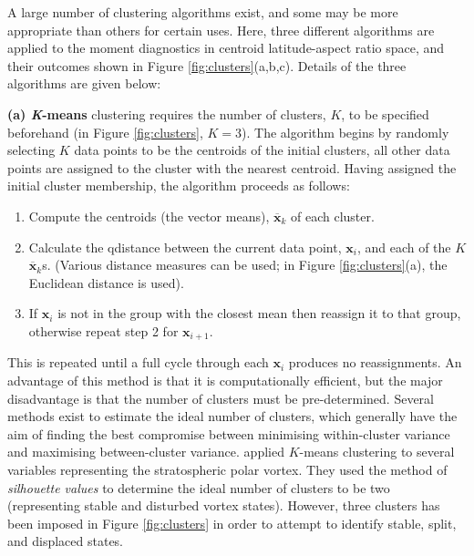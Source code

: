 A large number of clustering algorithms exist, and some may be more appropriate
than others for certain uses. Here, three different algorithms are applied to
the moment diagnostics in centroid latitude-aspect ratio space, and their
outcomes shown in Figure \ref{fig:clusters}(a,b,c). Details of the three
algorithms are given below:

\bigskip\noindent\textbf{(a) \textit{K}-means} clustering requires the number of
clusters, $K$, to be specified beforehand (in Figure \ref{fig:clusters},
$K=3$). The algorithm begins by randomly selecting $K$ data points to be the
centroids of the initial clusters, all other data points are assigned to the
cluster with the nearest centroid. Having assigned the initial cluster
membership, the algorithm proceeds as follows:
\begin{enumerate}[1.]
\item Compute the centroids (the vector means), $\mathbf{\overline{x}}_k$ of
  each cluster.
\item Calculate the qdistance between the current data point, $\mathbf{x}_i$,
  and each of the $K$ $\mathbf{\overline{x}}_k$s. (Various distance measures can
  be used; in Figure \ref{fig:clusters}(a), the Euclidean distance is used).
\item If $\mathbf{x}_i$ is not in the group with the closest mean then reassign
  it to that group, otherwise repeat step 2 for $\mathbf{x}_{i+1}$.
\end{enumerate}
This is repeated until a full cycle through each $\mathbf{x}_i$ produces no
reassignments. An advantage of this method is that it is computationally
efficient, but the major disadvantage is that the number of clusters must be
pre-determined. Several methods exist to estimate the ideal number of clusters,
which generally have the aim of finding the best compromise between minimising
within-cluster variance and maximising between-cluster
variance. \citet{K.Coughlin2009} applied $K$-means clustering to several
variables representing the stratospheric polar vortex. They used the method of
\emph{silhouette values} \citep{Rousseeuw1987} to determine the ideal number of
clusters to be two (representing stable and disturbed vortex states). However,
three clusters has been imposed in Figure \ref{fig:clusters} in order to attempt
to identify stable, split, and displaced states.


